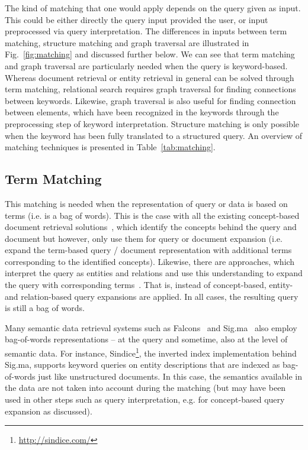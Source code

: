 The kind of matching that one would apply depends on the query given as input. This could be either directly the query input provided the user, or input preprocessed via query interpretation. 
The differences in inputs between term matching, structure matching and graph traversal are illustrated in Fig.~\ref{fig:matching} and discussed further below. We can see that term matching and graph traversal are particularly needed when the query is keyword-based. Whereas document retrieval or entity retrieval in general can be solved through term matching, relational search requires graph traversal for finding connections between keywords. Likewise, graph traversal is also useful for finding connection between elements, which have been recognized in the keywords through the preprocessing step of keyword interpretation. Structure matching is only possible when the keyword has been fully translated to a structured query. An overview of matching techniques is presented in Table~\ref{tab:matching}. 

\subsection{Term Matching} 
This matching is needed when the representation of query or data is based on terms (i.e. is a bag of words). This is the case with all the existing concept-based document retrieval solutions~\cite{DBLP:conf/sigir/Giger88,DBLP:conf/sigir/ZhongH06,DBLP:conf/trec/JelierSEWMSMK03,DBLP:conf/sigir/QiuF93,DBLP:conf/sigir/QiuF93,DBLP:conf/sigir/Voorhees93,DBLP:conf/sigir/Voorhees94,DBLP:journals/ipm/MeijTRK10}, which identify the concepts behind the query and document but however, only use them for query or document expansion (i.e. expand the term-based query / document representation with additional terms corresponding to the identified concepts). Likewise, there are approaches, which interpret the query as entities and relations and use this understanding to expand the query with corresponding terms~\cite{DBLP:series/sci/NgoC10}. That is, instead of concept-based, entity- and relation-based query expansions are applied. In all cases, the resulting query is still a bag of words. 

Many semantic data retrieval systems such as Falcons~\cite{DBLP:journals/ijswis/ChengQ09} and Sig.ma~\cite{DBLP:journals/ws/TummarelloCCDDD10} also employ bag-of-words representations -- at the query and sometime, also at the level of semantic data. For instance, Sindice\footnote{\url{http://sindice.com/}}, the inverted index implementation behind Sig.ma, supports keyword queries on entity descriptions that are indexed as bag-of-words just like unstructured documents. In this case, the semantics available in the data are not taken into account during the matching (but may have been used in other steps such as query interpretation, e.g. for concept-based query expansion as discussed). 

